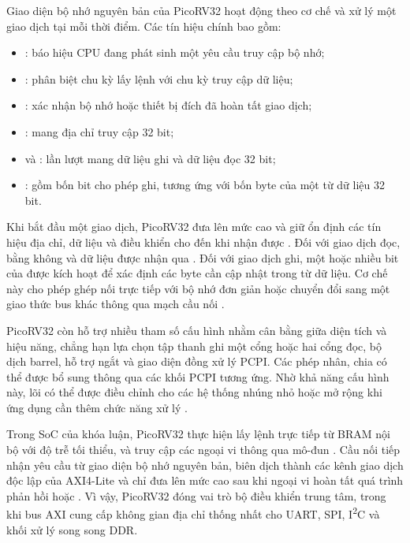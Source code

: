 Giao diện bộ nhớ nguyên bản của PicoRV32 hoạt động theo cơ chế
 và xử lý một giao dịch tại mỗi thời điểm. Các tín hiệu chính
bao gồm:
\begin{itemize}
    \item {}: báo hiệu CPU đang phát sinh một yêu cầu truy cập bộ nhớ;
    \item {}: phân biệt chu kỳ lấy lệnh với chu kỳ truy cập dữ liệu;
    \item {}: xác nhận bộ nhớ hoặc thiết bị đích đã hoàn tất giao dịch;
    \item {}: mang địa chỉ truy cập 32 bit;
    \item {} và : lần lượt mang dữ liệu ghi và dữ liệu đọc 32 bit;
    \item {}: gồm bốn bit cho phép ghi, tương ứng với bốn byte của một từ dữ liệu 32 bit.
\end{itemize}

Khi bắt đầu một giao dịch, PicoRV32 đưa  lên mức cao và giữ ổn
định các tín hiệu địa chỉ, dữ liệu và điều khiển cho đến khi nhận được
. Đối với giao dịch đọc,  bằng không và dữ liệu
được nhận qua . Đối với giao dịch ghi, một hoặc nhiều bit của
 được kích hoạt để xác định các byte cần cập nhật trong từ dữ
liệu. Cơ chế này cho phép ghép nối trực tiếp với bộ nhớ đơn giản hoặc chuyển đổi
sang một giao thức bus khác thông qua mạch cầu nối \cite{picorv32_repo}.

PicoRV32 còn hỗ trợ nhiều tham số cấu hình nhằm cân bằng giữa diện tích và hiệu
năng, chẳng hạn lựa chọn tập thanh ghi một cổng hoặc hai cổng đọc, bộ dịch barrel,
hỗ trợ ngắt và giao diện đồng xử lý PCPI. Các phép nhân, chia có thể được bổ sung
thông qua các khối PCPI tương ứng. Nhờ khả năng cấu hình này, lõi có thể được
điều chỉnh cho các hệ thống nhúng nhỏ hoặc mở rộng khi ứng dụng cần thêm chức
năng xử lý \cite{picorv32_repo}.

Trong SoC của khóa luận, PicoRV32 thực hiện lấy lệnh trực tiếp từ BRAM nội bộ với độ trễ tối thiểu, và truy cập
các ngoại vi thông qua mô-đun . Cầu nối tiếp nhận yêu
cầu từ giao diện bộ nhớ nguyên bản, biên dịch thành các kênh giao dịch độc lập của AXI4-Lite và chỉ đưa
 lên mức cao sau khi ngoại vi hoàn tất quá trình phản hồi  hoặc . Vì vậy,
PicoRV32 đóng vai trò bộ điều khiển trung tâm, trong khi bus AXI cung cấp không
gian địa chỉ thống nhất cho UART, SPI, I\textsuperscript{2}C và khối xử lý song
song DDR.

